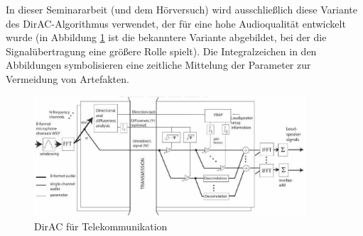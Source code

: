 
In dieser Seminararbeit (und dem Hörversuch) wird ausschließlich diese Variante des DirAC-Algorithmus verwendet, der für eine hohe Audioqualität entwickelt wurde (in Abbildung \ref{fig:dirac_flow_low} ist die bekanntere Variante abgebildet, bei der die Signalübertragung eine größere Rolle spielt). Die Integralzeichen in den Abbildungen symbolisieren eine zeitliche Mittelung der Parameter zur Vermeidung von Artefakten.

\begin{figure}[!ht]
  \centering
  \includegraphics[width=0.9\textwidth]{funktionsweise/pic/pulkki_dirac_flow_3.png}
  \caption{DirAC für Telekommunikation \cite{pulkki}}
  \label{fig:dirac_flow_low}
\end{figure}